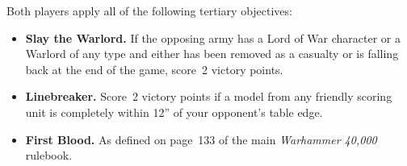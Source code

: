 \documentclass{40k}
\begin{document}
  Both players apply all of
the following tertiary objectives:

\begin{itemize}
\item \textbf{Slay the Warlord.}  If the opposing army has a Lord of
  War character or a Warlord of any type and either has been removed
  as a casualty or is falling back at the end of the game, score~2
  victory points.

\item \textbf{Linebreaker.}  Score~2 victory points if a model from
  any friendly scoring unit is completely within 12'' of your
  opponent's table edge.

\item \textbf{First Blood.}  As defined on page~133 of the main
  \emph{Warhammer 40,000} rulebook.
\end{itemize}
\end{document}

